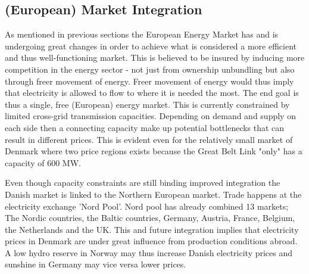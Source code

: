

\subsection{(European) Market Integration}
\label{subsec:t_EU}
As mentioned in previous sections the European Energy Market has and is undergoing great changes in order to achieve what is considered a more efficient and thus well-functioning market. This is believed to be insured by inducing more competition in the energy sector - not just from ownership unbundling but also through freer movement of energy. Freer movement of energy would thus imply that electricity is allowed to flow to where it is needed the most. The end goal is thus a single, free (European) energy market. This is currently constrained by limited cross-grid transmission capacities. Depending on demand and supply on each side then a connecting capacity make up potential bottlenecks that can result in different prices.%
This is evident even for the relatively small market of Denmark where two price regions exists because the Great Belt Link "only" has a capacity of 600 MW.
\par
Even though capacity constraints are still binding improved integration the Danish market is linked to the Northern European market. Trade happens at the electricity exchange 'Nord Pool'. Nord pool has already combined 13 markets; The Nordic countries, the Baltic countries, Germany, Austria, France, Belgium, the Netherlands and the UK.  This and future integration implies that electricity prices in Denmark are under great influence from production conditions abroad. A low hydro reserve in Norway may thus increase Danish electricity prices and sunshine in Germany may vice versa lower prices.
\par

